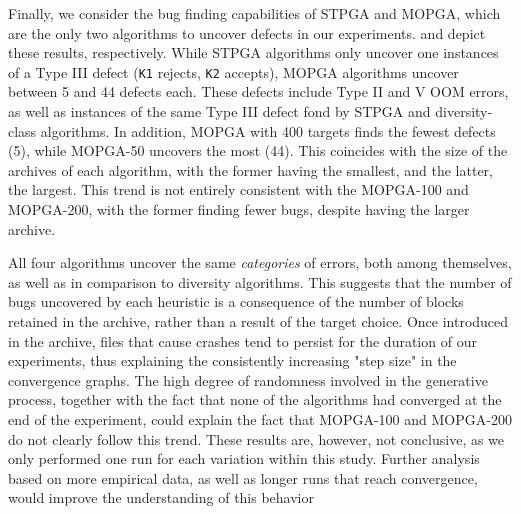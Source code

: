 Finally, we consider the bug finding capabilities of \gls{STPGA} and \gls{MOPGA},
which are the only two algorithms to uncover defects in our experiments.
 and  depict these results, respectively.
While \gls{STPGA} algorithms only uncover one instances of a Type III defect (\texttt{K1} rejects,
\texttt{K2} accepts), \gls{MOPGA} algorithms uncover between 5 and 44 defects each.
These defects include Type II and V \gls{OOM} errors, as well as instances 
of the same Type III defect fond by \gls{STPGA} and diversity-class algorithms.
In addition, \gls{MOPGA} with 400 targets finds the fewest defects (5), 
while \gls{MOPGA}-50 uncovers the most (44).
This coincides with the size of the archives of each algorithm,
with the former having the smallest, and the latter, the largest.
This trend is not entirely consistent with the \gls{MOPGA}-100 and \gls{MOPGA}-200,
with the former finding fewer bugs, despite having the larger archive.

All four algorithms uncover the same \textit{categories} of errors, 
both among themselves, as well as in comparison to diversity algorithms.
This suggests that the number of bugs uncovered by each heuristic is
a consequence of the number of blocks retained in the archive,
rather than a result of the target choice.
Once introduced in the archive, files that cause crashes tend to persist
for the duration of our experiments, thus explaining the consistently increasing
"step size" in the convergence graphs.
The high degree of randomness involved in the generative process, together
with the fact that none of the algorithms had converged at the end of the experiment,
could explain the fact that \gls{MOPGA}-100 and \gls{MOPGA}-200 do not clearly follow this trend.
These results are, however, not conclusive, as we only performed one
run for each variation within this study.
Further analysis based on more empirical data, as well as longer runs that reach convergence,
would improve the understanding of this behavior

